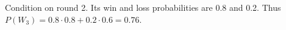 Condition on round 2. Its win and loss probabilities are 0.8 and 0.2. Thus $ P(W_3)=0.8\cdot0.8+0.2\cdot0.6=\boxed{0.76}$.
